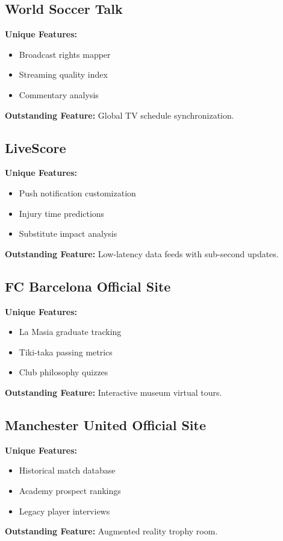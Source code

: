 \documentclass{report}
\begin{document}
\subsection{World Soccer Talk}
\textbf{Unique Features:}
\begin{itemize}
    \item Broadcast rights mapper
    \item Streaming quality index
    \item Commentary analysis
\end{itemize}
\textbf{Outstanding Feature:} Global TV schedule synchronization\citep{worldsoccertalk}.

\subsection{LiveScore}
\textbf{Unique Features:}
\begin{itemize}
    \item Push notification customization
    \item Injury time predictions
    \item Substitute impact analysis
\end{itemize}
\textbf{Outstanding Feature:} Low-latency data feeds with sub-second updates\citep{livescore}.

\subsection{FC Barcelona Official Site}
\textbf{Unique Features:}
\begin{itemize}
    \item La Masia graduate tracking
    \item Tiki-taka passing metrics
    \item Club philosophy quizzes
\end{itemize}
\textbf{Outstanding Feature:} Interactive museum virtual tours\citep{fcb}.

\subsection{Manchester United Official Site}
\textbf{Unique Features:}
\begin{itemize}
    \item Historical match database
    \item Academy prospect rankings
    \item Legacy player interviews
\end{itemize}
\textbf{Outstanding Feature:} Augmented reality trophy room\citep{manutd}.
\end{document}
